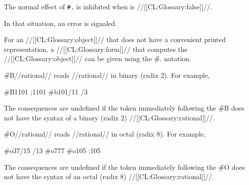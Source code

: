 The normal effect of {\tt \#.} is inhibited when  is //[[CL:Glossary:false]]//.


In that situation, an error  is signaled.



For an //[[CL:Glossary:object]]//
that does not have a convenient printed
representation, a //[[CL:Glossary:form]]// that computes the //[[CL:Glossary:object]]// can be given using
the \f{\#.} notation.







\endsubsubsection%










\f{\#B}//rational// reads //rational// in binary (radix 2).
For example, 

\code
 #B1101  ;1101\ssst
 #b101/11 /3
\endcode

The consequences are undefined if the token immediately following
the \f{\#B} does not have the syntax of a binary (\ie radix 2) //[[CL:Glossary:rational]]//.


\endsubsubsection%




\f{\#O}//rational// reads //rational// in octal (radix 8).
For example, 

\code
 #o37/15 /13
 #o777 
 #o105  ;105\ssse
\endcode

The consequences are undefined if the token immediately following
the \f{\#O} does not have the syntax of an octal (\ie radix 8) //[[CL:Glossary:rational]]//.


\endsubsubsection%




